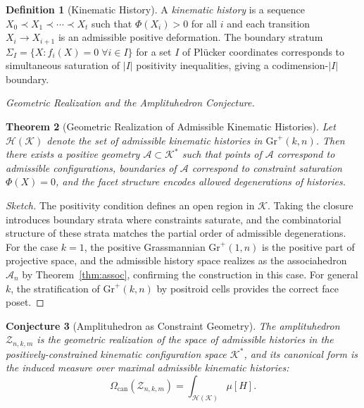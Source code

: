 \documentclass[11pt]{article}
\theoremstyle{plain}
\newtheorem{theorem}{Theorem}[section]
\newtheorem{conjecture}[theorem]{Conjecture}
\theoremstyle{definition}
\newtheorem{definition}[theorem]{Definition}
\theoremstyle{remark}
\newcommand{\Phif}{\Phi}
\newcommand{\Assoc}{\mathcal{A}_n}
\newcommand{\CF}{\Omega_{\mathrm{can}}}
\begin{document}
\begin{definition}[Kinematic History]
A \emph{kinematic history} is a sequence $X_0 \prec X_1 \prec \cdots \prec X_t$ such that $\Phif(X_i) > 0$ for all $i$ and each transition $X_i \to X_{i+1}$ is an admissible positive deformation. The boundary stratum $\Sigma_I = \{X : f_i(X) = 0 \; \forall i \in I\}$ for a set $I$ of Pl\"ucker coordinates corresponds to simultaneous saturation of $|I|$ positivity inequalities, giving a codimension-$|I|$ boundary.
\end{definition}

\medskip\noindent\textit{Geometric Realization and the Amplituhedron Conjecture.}

\begin{theorem}[Geometric Realization of Admissible Kinematic Histories]
\label{thm:amplituhedron-realization}
Let $\mathcal{H}(\mathcal{K})$ denote the set of admissible kinematic histories in $\mathrm{Gr}^+(k,n)$. Then there exists a positive geometry $\mathcal{A} \subset \mathcal{K}^*$ such that points of $\mathcal{A}$ correspond to admissible configurations, boundaries of $\mathcal{A}$ correspond to constraint saturation $\Phif(X) = 0$, and the facet structure encodes allowed degenerations of histories.
\end{theorem}

\begin{proof}[Sketch]
The positivity condition defines an open region in $\mathcal{K}$. Taking the closure introduces boundary strata where constraints saturate, and the combinatorial structure of these strata matches the partial order of admissible degenerations. For the case $k=1$, the positive Grassmannian $\mathrm{Gr}^+(1,n)$ is the positive part of projective space, and the admissible history space realizes as the associahedron $\Assoc$ by Theorem~\ref{thm:assoc}, confirming the construction in this case. For general $k$, the stratification of $\mathrm{Gr}^+(k,n)$ by positroid cells provides the correct face poset.
\end{proof}

\begin{conjecture}[Amplituhedron as Constraint Geometry]
\label{conj:amplituhedron}
The amplituhedron $\mathcal{Z}_{n,k,m}$ is the geometric realization of the space of admissible histories in the positively-constrained kinematic configuration space $\mathcal{K}^*$, and its canonical form is the induced measure over maximal admissible kinematic histories:
\[
  \CF(\mathcal{Z}_{n,k,m}) = \int_{\mathcal{H}(\mathcal{K})} \mu[H].
\]
\end{conjecture}
\end{document}
